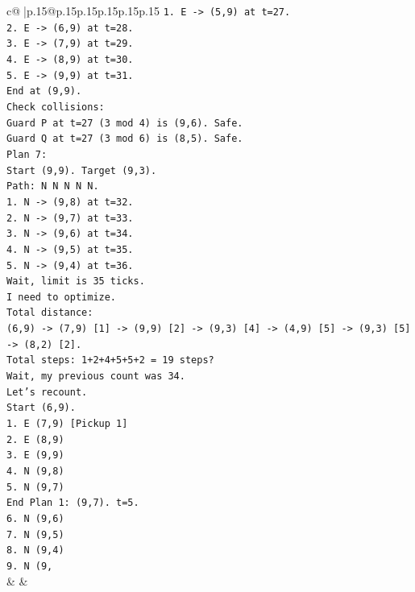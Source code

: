 \documentclass{article}
\begin{document}
{\begin{supertabular}{c@{$\;$}|p{.15\linewidth}@{}p{.15\linewidth}p{.15\linewidth}p{.15\linewidth}p{.15\linewidth}p{.15\linewidth}}
{{{\texttt{1. E {-}> (5,9) at t=27.} \\
\texttt{2. E {-}> (6,9) at t=28.} \\
\texttt{3. E {-}> (7,9) at t=29.} \\
\texttt{4. E {-}> (8,9) at t=30.} \\
\texttt{5. E {-}> (9,9) at t=31.} \\
\texttt{End at (9,9).} \\
\texttt{Check collisions:} \\
\texttt{Guard P at t=27 (3 mod 4) is (9,6). Safe.} \\
\texttt{Guard Q at t=27 (3 mod 6) is (8,5). Safe.} \\
\texttt{Plan 7:} \\
\texttt{Start (9,9). Target (9,3).} \\
\texttt{Path: N N N N N.} \\
\texttt{1. N {-}> (9,8) at t=32.} \\
\texttt{2. N {-}> (9,7) at t=33.} \\
\texttt{3. N {-}> (9,6) at t=34.} \\
\texttt{4. N {-}> (9,5) at t=35.} \\
\texttt{5. N {-}> (9,4) at t=36.} \\
\texttt{Wait, limit is 35 ticks.} \\
\texttt{I need to optimize.} \\
\texttt{Total distance:} \\
\texttt{(6,9) {-}> (7,9) {[}1{]} {-}> (9,9) {[}2{]} {-}> (9,3) {[}4{]} {-}> (4,9) {[}5{]} {-}> (9,3) {[}5{]} {-}> (8,2) {[}2{]}.} \\
\texttt{Total steps: 1+2+4+5+5+2 = 19 steps?} \\
\texttt{Wait, my previous count was 34.} \\
\texttt{Let's recount.} \\
\texttt{Start (6,9).} \\
\texttt{1. E (7,9) {[}Pickup 1{]}} \\
\texttt{2. E (8,9)} \\
\texttt{3. E (9,9)} \\
\texttt{4. N (9,8)} \\
\texttt{5. N (9,7)} \\
\texttt{End Plan 1: (9,7). t=5.} \\
\texttt{6. N (9,6)} \\
\texttt{7. N (9,5)} \\
\texttt{8. N (9,4)} \\
\texttt{9. N (9,} \\
            }
        }
    }
    & & \\ \\


\end{supertabular}}
\end{document}
